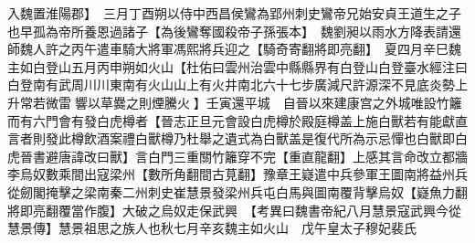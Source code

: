 入魏置淮陽郡】　三月丁酉朔以侍中西昌侯鸞為郢州刺史鸞帝兄始安貞王道生之子也早孤為帝所養恩過諸子【為後鸞奪國殺帝子孫張本】　魏劉昶以雨水方降表請還師魏人許之丙午遣車騎大將軍馮熙將兵迎之【騎奇寄翻將即亮翻】　夏四月辛巳魏主如白登山五月丙申朔如火山【杜佑曰雲州治雲中縣縣界有白登山白登臺水經注曰白登南有武周川川東南有火山山上有火井南北六十七步廣減尺許源深不見底炎勢上升常若微雷響以草爨之則煙騰火】壬寅還平城　自晉以來建康宫之外城唯設竹籬而有六門會有發白虎樽者【晉志正旦元會設白虎樽於殿庭樽盖上施白獸若有能獻直言者則發此樽飲酒案禮白獸樽乃杜舉之遺式為白獸盖是復代所為示忌憚也白獸即白虎晉書避唐諱改曰獸】言白門三重關竹籬穿不完【重直龍翻】上感其言命改立都牆　李烏奴數乘間出寇梁州【數所角翻間古莧翻】豫章王嶷遣中兵參軍王圖南將益州兵從劒閣掩擊之梁南秦二州刺史崔慧景發梁州兵屯白馬與圖南覆背擊烏奴【嶷魚力翻將即亮翻覆當作腹】大破之烏奴走保武興　【考異曰魏書帝紀八月慧景寇武興今從慧景傳】慧景祖思之族人也秋七月辛亥魏主如火山　戊午皇太子穆妃裴氏

